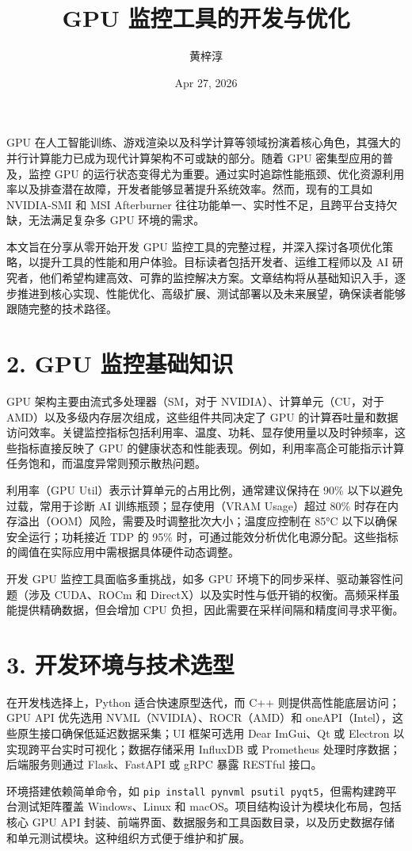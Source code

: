 \title{GPU 监控工具的开发与优化}
\author{黄梓淳}
\date{Apr 27, 2026}
\maketitle
GPU 在人工智能训练、游戏渲染以及科学计算等领域扮演着核心角色，其强大的并行计算能力已成为现代计算架构不可或缺的部分。随着 GPU 密集型应用的普及，监控 GPU 的运行状态变得尤为重要。通过实时追踪性能瓶颈、优化资源利用率以及排查潜在故障，开发者能够显著提升系统效率。然而，现有的工具如 NVIDIA-SMI 和 MSI Afterburner 往往功能单一、实时性不足，且跨平台支持欠缺，无法满足复杂多 GPU 环境的需求。\par
本文旨在分享从零开始开发 GPU 监控工具的完整过程，并深入探讨各项优化策略，以提升工具的性能和用户体验。目标读者包括开发者、运维工程师以及 AI 研究者，他们希望构建高效、可靠的监控解决方案。文章结构将从基础知识入手，逐步推进到核心实现、性能优化、高级扩展、测试部署以及未来展望，确保读者能够跟随完整的技术路径。\par
\chapter{2. GPU 监控基础知识}
GPU 架构主要由流式多处理器（SM，对于 NVIDIA）、计算单元（CU，对于 AMD）以及多级内存层次组成，这些组件共同决定了 GPU 的计算吞吐量和数据访问效率。关键监控指标包括利用率、温度、功耗、显存使用量以及时钟频率，这些指标直接反映了 GPU 的健康状态和性能表现。例如，利用率高企可能指示计算任务饱和，而温度异常则预示散热问题。\par
利用率（GPU Util）表示计算单元的占用比例，通常建议保持在 90\%{} 以下以避免过载，常用于诊断 AI 训练瓶颈；显存使用（VRAM Usage）超过 80\%{} 时存在内存溢出（OOM）风险，需要及时调整批次大小；温度应控制在 85°C 以下以确保安全运行；功耗接近 TDP 的 95\%{} 时，可通过能效分析优化电源分配。这些指标的阈值在实际应用中需根据具体硬件动态调整。\par
开发 GPU 监控工具面临多重挑战，如多 GPU 环境下的同步采样、驱动兼容性问题（涉及 CUDA、ROCm 和 DirectX）以及实时性与低开销的权衡。高频采样虽能提供精确数据，但会增加 CPU 负担，因此需要在采样间隔和精度间寻求平衡。\par
\chapter{3. 开发环境与技术选型}
在开发栈选择上，Python 适合快速原型迭代，而 C++ 则提供高性能底层访问；GPU API 优先选用 NVML（NVIDIA）、ROCR（AMD）和 oneAPI（Intel），这些原生接口确保低延迟数据采集；UI 框架可选用 Dear ImGui、Qt 或 Electron 以实现跨平台实时可视化；数据存储采用 InfluxDB 或 Prometheus 处理时序数据；后端服务则通过 Flask、FastAPI 或 gRPC 暴露 RESTful 接口。\par
环境搭建依赖简单命令，如 \texttt{pip install pynvml psutil pyqt5}，但需构建跨平台测试矩阵覆盖 Windows、Linux 和 macOS。项目结构设计为模块化布局，包括核心 GPU API 封装、前端界面、数据服务和工具函数目录，以及历史数据存储和单元测试模块。这种组织方式便于维护和扩展。\par
